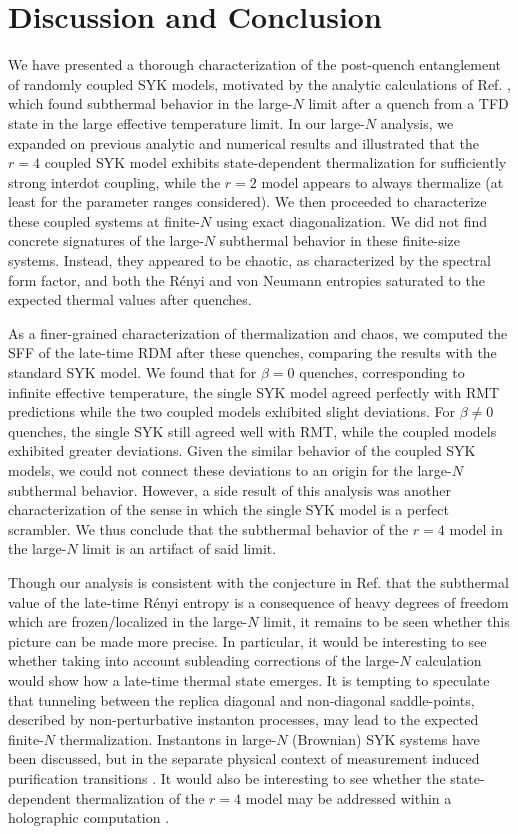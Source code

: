 \documentclass[reprint, floatfix,eqsecnum,superscriptaddress,preprint,nofootinbib,onecolumn,amsmath,amssymb,aps,prb]{revtex4-2}
\begin{document}
\section{Discussion and Conclusion \label{sec:discussion} }

We have presented a thorough characterization of the post-quench entanglement of randomly coupled SYK models, motivated by the analytic calculations of Ref. \cite{Gu2017b}, which found subthermal behavior in the large-$N$ limit after a quench from a TFD state in the large effective temperature limit. In our large-$N$ analysis, we expanded on previous analytic and numerical results and illustrated that the $r=4$ coupled SYK model exhibits state-dependent thermalization for sufficiently strong interdot coupling, while the $r=2$ model appears to always thermalize (at least for the parameter ranges considered). We then proceeded to characterize these coupled systems at finite-$N$ using exact diagonalization. We did not find concrete signatures of the large-$N$ subthermal behavior in these finite-size systems. Instead, they appeared to be chaotic, as characterized by the spectral form factor, and both the R\'enyi and von Neumann entropies saturated to the expected thermal values after quenches.

As a finer-grained characterization of thermalization and chaos, we computed the SFF of the late-time RDM after these quenches, comparing the results with the standard SYK model. We found that for $\beta = 0$ quenches, corresponding to infinite effective temperature, the single SYK model agreed perfectly with RMT predictions while the two coupled models exhibited slight deviations. For $\beta \neq 0$ quenches, the single SYK still agreed well with RMT, while the coupled models exhibited greater deviations. Given the similar behavior of the coupled SYK models, we could not connect these deviations to an origin for the large-$N$ subthermal behavior. However, a side result of this analysis was another characterization of the sense in which the single SYK model is a perfect scrambler. We thus conclude that the subthermal behavior of the $r=4$ model in the large-$N$ limit is an artifact of said limit.

Though our analysis is consistent with the conjecture in Ref. \cite{Gu2017b} that the subthermal value of the late-time R\'enyi entropy is a consequence of  heavy degrees of freedom which are frozen/localized in the large-$N$ limit, it remains to be seen whether this picture can be made more precise. In particular, it would be interesting to see whether taking into account subleading corrections of the large-$N$ calculation would show how a late-time thermal state emerges. It is tempting to speculate that tunneling between the replica diagonal and non-diagonal saddle-points, described by non-perturbative instanton processes, may lead to the expected finite-$N$ thermalization. Instantons in large-$N$ (Brownian) SYK systems have been discussed, but in the separate physical context of measurement induced purification transitions \cite{Bentsen2021}. It would also be interesting to see whether the state-dependent thermalization of the $r=4$ model may be addressed within a holographic computation \cite{Ryu2006a,Ryu2006b,Hubeny2007,Dong2016}.
\end{document}
